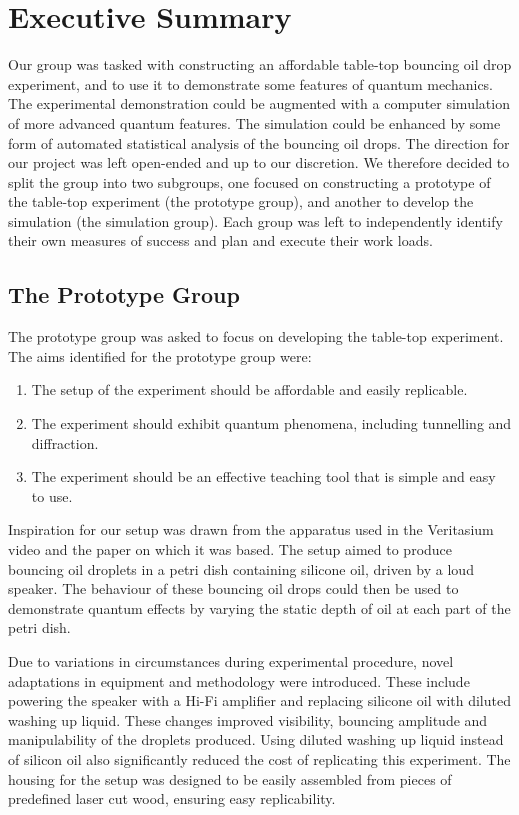 \section*{Executive Summary}
Our group was tasked with constructing an affordable table-top bouncing oil drop experiment, and to use it to demonstrate some features of quantum mechanics. The experimental demonstration could be augmented with a computer simulation of more advanced quantum features. The simulation could be enhanced by some form of automated statistical analysis of the bouncing oil drops. The direction for our project was left open-ended and up to our discretion. We therefore decided to split the group into two subgroups, one focused on constructing a prototype of the table-top experiment (the prototype group), and another to develop the simulation (the simulation group). Each group was left to independently identify their own measures of success and plan and execute their work loads.

\subsection*{The Prototype Group}
The prototype group was asked to focus on developing the table-top experiment. The aims identified for the prototype group were:
\begin{enumerate}
    \item The setup of the experiment should be affordable and easily replicable.
\item The experiment should exhibit quantum phenomena, including tunnelling and diffraction.
\item The experiment should be an effective teaching tool that is simple and easy to use.
\end{enumerate}

Inspiration for our setup was drawn from the apparatus used in the Veritasium video \cite{Veritasium:2016} and the paper on which it was based. The setup aimed to produce bouncing oil droplets in a petri dish containing silicone oil, driven by a loud speaker. The behaviour of these bouncing oil drops could then be used to demonstrate quantum effects by varying the static depth of oil at each part of the petri dish.

Due to variations in circumstances during experimental procedure, novel adaptations in equipment and methodology were introduced. These include powering the speaker with a Hi-Fi amplifier and replacing silicone oil with diluted washing up liquid. These changes improved visibility, bouncing amplitude and manipulability of the droplets produced. Using diluted washing up liquid instead of silicon oil also significantly reduced the cost of replicating this experiment. The housing for the setup was designed to be easily assembled from pieces of predefined laser cut wood, ensuring easy replicability.  


